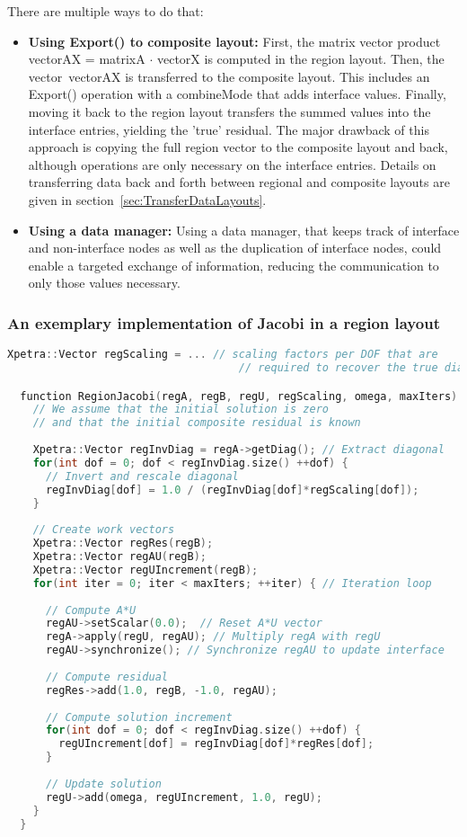 \documentclass[11pt]{article}
\begin{document}
There are multiple ways to do that:
\begin{itemize}
\item {\bf Using {\sf Export()} to composite layout:} First, the matrix vector product {\sf vectorAX = matrixA $\cdot$ vectorX} is computed in the region layout. Then, the vector~{\sf vectorAX} is transferred to the composite layout. This includes an {\sf Export()} operation with a {\sf combineMode} that adds interface values. Finally, moving it back to the region layout transfers the summed values into the interface entries, yielding the 'true' residual. The major drawback of this approach is copying the full region vector to the composite layout and back, although operations are only necessary on the interface entries. Details on transferring data back and forth between regional and composite layouts are given in section~\ref{sec:TransferDataLayouts}.
\item {\bf Using a data manager:} Using a data manager, that keeps track of interface and non-interface nodes as well as the duplication of interface nodes, could enable a targeted exchange of information, reducing the communication to only those values necessary.
\end{itemize}

\subsubsection{An exemplary implementation of Jacobi in a region layout}

\begin{lstlisting}[language=c++]
	Xpetra::Vector regScaling = ... // scaling factors per DOF that are 
	                                // required to recover the true diagonal

  function RegionJacobi(regA, regB, regU, regScaling, omega, maxIters) {
    // We assume that the initial solution is zero 
    // and that the initial composite residual is known
    
    Xpetra::Vector regInvDiag = regA->getDiag(); // Extract diagonal
    for(int dof = 0; dof < regInvDiag.size() ++dof) {
      // Invert and rescale diagonal
      regInvDiag[dof] = 1.0 / (regInvDiag[dof]*regScaling[dof]);
    }
    
    // Create work vectors
    Xpetra::Vector regRes(regB);
    Xpetra::Vector regAU(regB);
    Xpetra::Vector regUIncrement(regB);
    for(int iter = 0; iter < maxIters; ++iter) { // Iteration loop
      
      // Compute A*U
      regAU->setScalar(0.0);  // Reset A*U vector
      regA->apply(regU, regAU); // Multiply regA with regU
      regAU->synchronize(); // Synchronize regAU to update interface
      
      // Compute residual
      regRes->add(1.0, regB, -1.0, regAU);
      
      // Compute solution increment
      for(int dof = 0; dof < regInvDiag.size() ++dof) {
        regUIncrement[dof] = regInvDiag[dof]*regRes[dof];
      }
      
      // Update solution
      regU->add(omega, regUIncrement, 1.0, regU);
    }
  }
\end{lstlisting}
\end{document}
